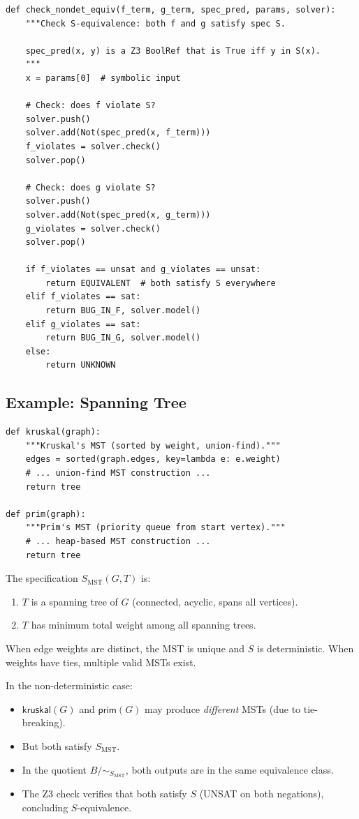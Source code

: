 \documentclass[11pt,a4paper]{report}
\theoremstyle{definition}
\theoremstyle{plain}
\begin{document}
\begin{lstlisting}[caption={Non-deterministic spec check in Z3}]
def check_nondet_equiv(f_term, g_term, spec_pred, params, solver):
    """Check S-equivalence: both f and g satisfy spec S.

    spec_pred(x, y) is a Z3 BoolRef that is True iff y in S(x).
    """
    x = params[0]  # symbolic input

    # Check: does f violate S?
    solver.push()
    solver.add(Not(spec_pred(x, f_term)))
    f_violates = solver.check()
    solver.pop()

    # Check: does g violate S?
    solver.push()
    solver.add(Not(spec_pred(x, g_term)))
    g_violates = solver.check()
    solver.pop()

    if f_violates == unsat and g_violates == unsat:
        return EQUIVALENT  # both satisfy S everywhere
    elif f_violates == sat:
        return BUG_IN_F, solver.model()
    elif g_violates == sat:
        return BUG_IN_G, solver.model()
    else:
        return UNKNOWN
\end{lstlisting}

\subsection{Example: Spanning Tree}

\begin{lstlisting}[caption={Two spanning tree algorithms}]
def kruskal(graph):
    """Kruskal's MST (sorted by weight, union-find)."""
    edges = sorted(graph.edges, key=lambda e: e.weight)
    # ... union-find MST construction ...
    return tree

def prim(graph):
    """Prim's MST (priority queue from start vertex)."""
    # ... heap-based MST construction ...
    return tree
\end{lstlisting}

The specification $S_{\mathrm{MST}}(G, T)$ is:
\begin{enumerate}
  \item $T$ is a spanning tree of $G$ (connected, acyclic, spans all vertices).
  \item $T$ has minimum total weight among all spanning trees.
\end{enumerate}

When edge weights are distinct, the MST is unique and $S$ is
deterministic.  When weights have ties, multiple valid MSTs exist.

In the non-deterministic case:
\begin{itemize}
  \item $\mathsf{kruskal}(G)$ and $\mathsf{prim}(G)$ may produce
    \emph{different} MSTs (due to tie-breaking).
  \item But both satisfy $S_{\mathrm{MST}}$.
  \item In the quotient $B / {\sim_{S_{\mathrm{MST}}}}$, both outputs
    are in the same equivalence class.
  \item The Z3 check verifies that both satisfy $S$ (UNSAT on both
    negations), concluding $S$-equivalence.
\end{itemize}
\end{document}
